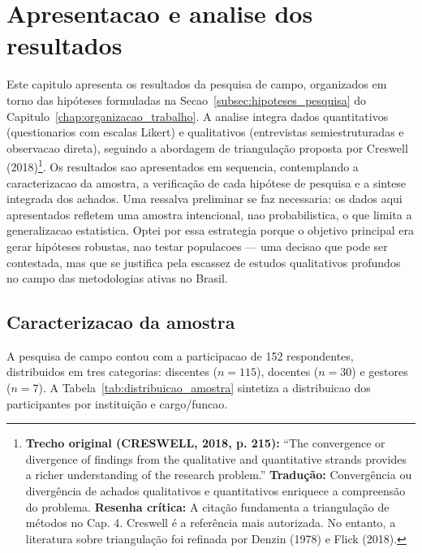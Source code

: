 ﻿%

\chapter{Apresentacao e analise dos resultados}
\label{chap:resultados}

Este capitulo apresenta os resultados da pesquisa de campo, organizados em torno das hipóteses formuladas na Secao~\ref{subsec:hipoteses_pesquisa} do Capitulo~\ref{chap:organizacao_trabalho}. A analise integra dados quantitativos (questionarios com escalas Likert) e qualitativos (entrevistas semiestruturadas e observacao direta), seguindo a abordagem de triangulação proposta por Creswell (2018)\footnote{\textbf{Trecho original (CRESWELL, 2018, p. 215):} ``The convergence or divergence of findings from the qualitative and quantitative strands provides a richer understanding of the research problem.'' \textbf{Tradução:} Convergência ou divergência de achados qualitativos e quantitativos enriquece a compreensão do problema. \textbf{Resenha crítica:} A citação fundamenta a triangulação de métodos no Cap. 4. Creswell é a referência mais autorizada. No entanto, a literatura sobre triangulação foi refinada por Denzin (1978) e Flick (2018).}. Os resultados sao apresentados em sequencia, contemplando a caracterizacao da amostra, a verificação de cada hipótese de pesquisa e a sintese integrada dos achados. Uma ressalva preliminar se faz necessaria: os dados aqui apresentados refletem uma amostra intencional, nao probabilistica, o que limita a generalizacao estatistica. Optei por essa estrategia porque o objetivo principal era gerar hipóteses robustas, nao testar populacoes — uma decisao que pode ser contestada, mas que se justifica pela escassez de estudos qualitativos profundos no campo das metodologias ativas no Brasil.

\section{Caracterizacao da amostra}
\label{sec:caracterizacao_amostra}

A pesquisa de campo contou com a participacao de 152 respondentes, distribuidos em tres categorias: discentes ($n = 115$), docentes ($n = 30$) e gestores ($n = 7$). A Tabela~\ref{tab:distribuicao_amostra} sintetiza a distribuicao dos participantes por instituição e cargo/funcao.

